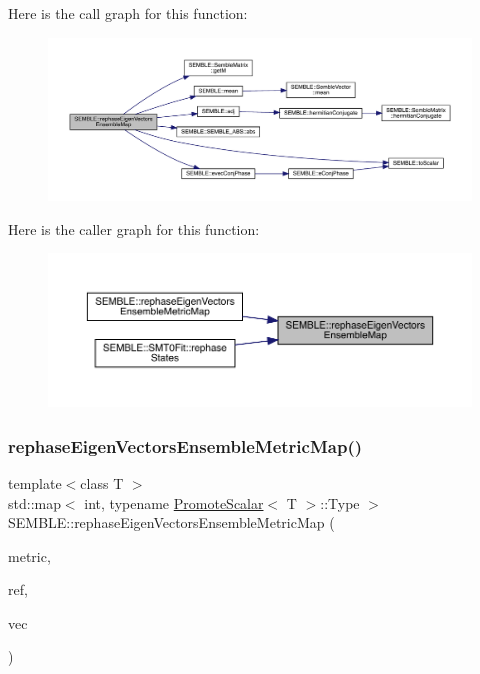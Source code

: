 Here is the call graph for this function\+:
\nopagebreak
\begin{figure}[H]
\begin{center}
\leavevmode
\includegraphics[width=350pt]{d7/dfd/namespaceSEMBLE_aec7678ee7a5da493a6b088df20493a1f_cgraph}
\end{center}
\end{figure}
Here is the caller graph for this function\+:
\nopagebreak
\begin{figure}[H]
\begin{center}
\leavevmode
\includegraphics[width=350pt]{d7/dfd/namespaceSEMBLE_aec7678ee7a5da493a6b088df20493a1f_icgraph}
\end{center}
\end{figure}
\mbox{\label{namespaceSEMBLE_a6720e329f02e8313f422d94b8a416230}} 
\subsubsection{\texorpdfstring{rephaseEigenVectorsEnsembleMetricMap()}{rephaseEigenVectorsEnsembleMetricMap()}}
{\footnotesize\ttfamily template$<$class T $>$ \\
std\+::map$<$ int, typename \mbox{\hyperlink{structSEMBLE_1_1PromoteScalar}{Promote\+Scalar}}$<$ T $>$\+::Type $>$ S\+E\+M\+B\+L\+E\+::rephase\+Eigen\+Vectors\+Ensemble\+Metric\+Map (\begin{DoxyParamCaption}\item[{const \mbox{\hyperlink{structSEMBLE_1_1SembleMatrix}{Semble\+Matrix}}$<$ T $>$ \&}]{metric,  }\item[{const \mbox{\hyperlink{structSEMBLE_1_1SembleMatrix}{Semble\+Matrix}}$<$ T $>$ \&}]{ref,  }\item[{const \mbox{\hyperlink{structSEMBLE_1_1SembleMatrix}{Semble\+Matrix}}$<$ T $>$ \&}]{vec }\end{DoxyParamCaption})}

